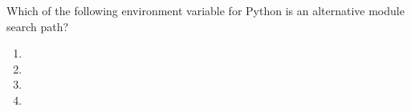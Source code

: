 \question
Which of the following environment variable for Python is an alternative module search path?

\begin{enumerate}
\item \lstinline@PYTHONPATH@
\item \lstinline@PYTHONSTARTUP@
\item \lstinline@PYTHONCASEOK@
\item \lstinline@PYTHONHOME@
\end{enumerate}

